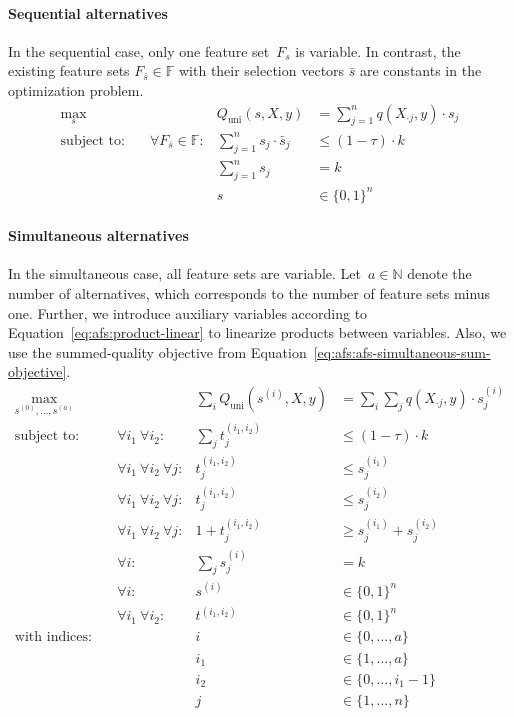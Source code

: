 \documentclass{article}
\theoremstyle{definition}
\begin{document}
\paragraph{Sequential alternatives}

In the sequential case, only one feature set~$F_s$ is variable.
In contrast, the existing feature sets $F_{\bar{s}} \in \mathbb{F}$ with their selection vectors $\bar{s}$ are constants in the optimization problem.
%
\begin{equation}
	\begin{aligned}
		\max_s &\quad & Q_{\text{uni}}(s,X,y) &= \sum_{j=1}^{n} q(X_{\cdot{}j},y) \cdot s_j \\
		\text{subject to:} &\quad \forall F_{\bar{s}} \in \mathbb{F}: & \sum_{j=1}^n s_j \cdot \bar{s}_j &\leq (1 - \tau) \cdot k \\
		&\quad & \sum_{j=1}^n s_j &= k \\
		&\quad & s &\in \{0,1\}^n
	\end{aligned}
	\label{eq:afs:afs-sequential-complete}
\end{equation}
%
\paragraph{Simultaneous alternatives}

In the simultaneous case, all feature sets are variable.
Let~$a \in \mathbb{N}$ denote the number of alternatives, which corresponds to the number of feature sets minus one.
Further, we introduce auxiliary variables according to Equation~\ref{eq:afs:product-linear} to linearize products between variables.
Also, we use the summed-quality objective from Equation~\ref{eq:afs:afs-simultaneous-sum-objective}.
%
\begin{equation}
	\begin{aligned}
		\max_{s^{(0)}, \dots, s^{(a)}} &\quad & \sum_i Q_{\text{uni}}(s^{(i)},X,y) &= \sum_i \sum_j q(X_{\cdot{}j},y) \cdot s^{(i)}_j\\
		\text{subject to:} &\quad \forall i_1~\forall i_2: & \sum_j t^{(i_1,i_2)}_j &\leq (1 - \tau) \cdot k \\
		&\quad \forall i_1~\forall i_2~\forall j: & t^{(i_1,i_2)}_j &\leq s^{(i_1)}_j \\
		&\quad \forall i_1~\forall i_2~\forall j: & t^{(i_1,i_2)}_j &\leq s^{(i_2)}_j \\
		&\quad \forall i_1~\forall i_2~\forall j: & 1 + t^{(i_1,i_2)}_j &\geq s^{(i_1)}_j + s^{(i_2)}_j \\
		&\quad \forall i: & \sum_j s^{(i)}_j &= k \\
		&\quad \forall i: & s^{(i)} &\in \{0,1\}^n \\
		&\quad \forall i_1~\forall i_2: & t^{(i_1,i_2)} &\in \{0,1\}^n \\
		\text{with indices:} &\quad & i &\in \{0, \dots, a\} \\
		&\quad & i_1 &\in \{1, \dots, a\} \\
		&\quad & i_2 &\in \{0, \dots, i_1-1\} \\
		&\quad & j &\in \{1, \dots, n\}
	\end{aligned}
	\label{eq:afs:afs-simultaneous-complete}
\end{equation}
\end{document}
